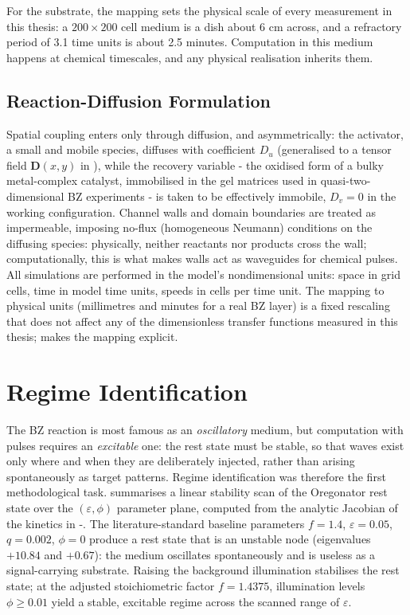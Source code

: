 For the substrate, the mapping sets the physical scale of every measurement in this thesis: a $200 \times 200$ cell medium is a dish about 6 cm across, and a refractory period of 3.1 time units is about 2.5 minutes.
Computation in this medium happens at chemical timescales, and any physical realisation inherits them.

\subsection{Reaction-Diffusion Formulation}
\label{sec:meth_rd}

Spatial coupling enters only through diffusion, and asymmetrically: the activator, a small and mobile species, diffuses with coefficient $D_{u}$ (generalised to a tensor field $\mathbf{D}(x,y)$ in ), while the recovery variable - the oxidised form of a bulky metal-complex catalyst, immobilised in the gel matrices used in quasi-two-dimensional BZ experiments - is taken to be effectively immobile, $D_{v} = 0$ in the working configuration. Channel walls and domain boundaries are treated as impermeable, imposing no-flux (homogeneous Neumann) conditions on the diffusing species: physically, neither reactants nor products cross the wall; computationally, this is what makes walls act as waveguides for chemical pulses.
All simulations are performed in the model's nondimensional units: space in grid cells, time in model time units, speeds in cells per time unit. The mapping to physical units (millimetres and minutes for a real BZ layer) is a fixed rescaling that does not affect any of the dimensionless transfer functions measured in this thesis;  makes the mapping explicit.

\section{Regime Identification}
\label{sec:meth_regime}

The BZ reaction is most famous as an \emph{oscillatory} medium, but computation with pulses requires an \emph{excitable} one: the rest state must be stable, so that waves exist only where and when they are deliberately injected, rather than arising spontaneously as target patterns.
Regime identification was therefore the first methodological task.
 summarises a linear stability scan of the Oregonator rest state over the $(\varepsilon, \phi)$ parameter plane, computed from the analytic Jacobian of the kinetics in -.
The literature-standard baseline parameters $f = 1.4$, $\varepsilon = 0.05$, $q = 0.002$, $\phi = 0$ produce a rest state that is an unstable node (eigenvalues $+10.84$ and $+0.67$): the medium oscillates spontaneously and is useless as a signal-carrying substrate.
Raising the background illumination stabilises the rest state; at the adjusted stoichiometric factor $f = 1.4375$, illumination levels $\phi \geq 0.01$ yield a stable, excitable regime across the scanned range of $\varepsilon$.

